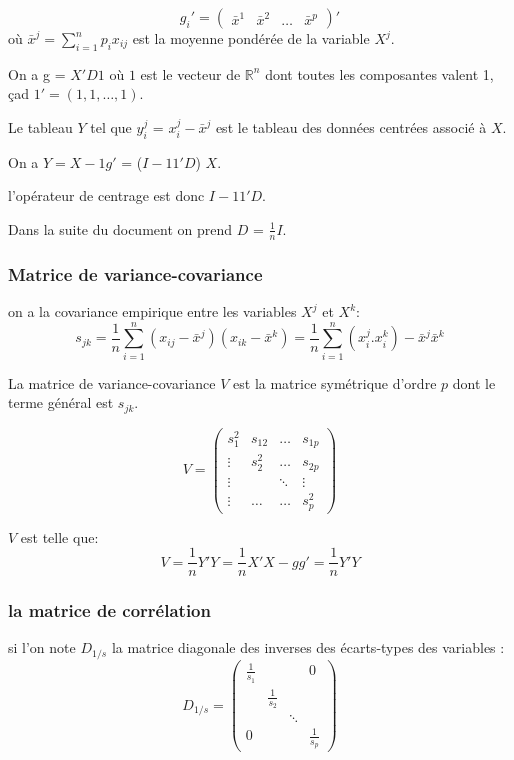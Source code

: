\documentclass[12pt,a4paper]{article}
\begin{document}
\[ g_i'= \begin{pmatrix} \bar{x}^{1} & \bar{x}^{2} & \dots & \bar{x}^{p} \end{pmatrix}' \]
où $\bar{x}^{j} = \sum_{i=1}^n p_i x_{ij}$ est la moyenne pondérée de la variable $X^{j}$.

On a g = $X'D1$ où $1$ est le vecteur de $\mathbb{R}^n$ dont toutes les composantes valent 1, çad $1' = (1, 1, \dots, 1)$.

Le tableau $Y$ tel que $y_{i}^j$ = $x_{i}^j - \bar{x}^{j}$ est le tableau des données centrées associé à $X$.

On a $Y = X - 1 g'$ = ($I - 1 1'D $) $X$.

l'opérateur de centrage est donc $I - 1 1'D$.

Dans la suite du document on prend $D$ = $\frac{1}{n} I$.

\subsubsection{Matrice de variance-covariance}

on a la covariance empirique entre les variables $X^{j}$ et $X^{k}$:
\[s_{jk} = \frac{1}{n}\sum_{i=1}^n (x_{ij} - \bar{x}^{j})(x_{ik} - \bar{x}^{k}) = \frac{1}{n}\sum_{i=1}^n (x_{i}^j . x_{i}^k) - \bar{x}^{j} \bar{x}^{k}\] 

La matrice de variance-covariance $V$ est la matrice symétrique d'ordre $p$ dont le terme général est $s_{jk}$.

\[V = \begin{pmatrix}
s_{1}^2 & s_{12} & \dots & s_{1p} \\
\vdots & s_{2}^2 & \dots & s_{2p} \\
\vdots &  & \ddots & \vdots \\
\vdots & \dots & \dots & s_{p}^2
\end{pmatrix}
\]

$V$ est telle que: 
\[V = \frac{1}{n} Y' Y = \frac{1}{n} X'X - g g' = \frac{1}{n} Y'Y \]

\subsubsection{la matrice de corrélation}

si l'on note $D_{1/s}$ la matrice diagonale des inverses des écarts-types des variables : 
\[D_{1/s} = \begin{pmatrix}
\frac{1}{s_1} &  &  & 0 \\
 & \frac{1}{s_2} &  &  \\
 & & \ddots & \\
0 &  & & \frac{1}{s_p}
\end{pmatrix}
\]
\end{document}
